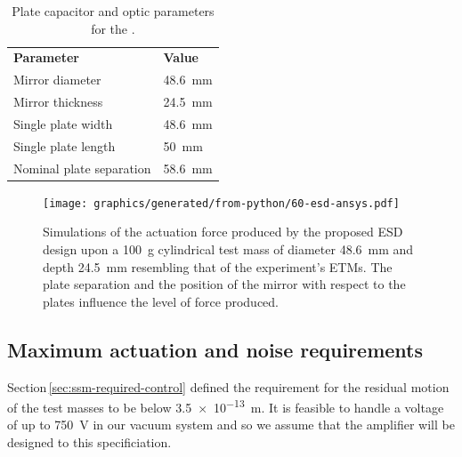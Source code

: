 \begin{table}
  \centering
  \begin{tabular}{ll}
    \textbf{Parameter}   & \textbf{Value} \\
    Mirror diameter      & \SI{48.6}{\milli\meter} \\
    Mirror thickness     & \SI{24.5}{\milli\meter} \\
    Single plate width   & \SI{48.6}{\milli\meter} \\
    Single plate length  & \SI{50}{\milli\meter} \\
    Nominal plate separation & \SI{58.6}{\milli\meter} \\
  \end{tabular}
  \caption[Plate capacitor and optic parameters for the \SSMEXPT{}]{\label{tab:ssm-esd-parameters}Plate capacitor and optic parameters for the \SSMEXPT{}.}
\end{table}

\begin{figure}
  \centering
  \texttt{[image: graphics/generated/from-python/60-esd-ansys.pdf]}
  \caption[Simulations of the actuation force produced by the proposed electrostatic drive design]{\label{fig:ssm-esd-ansys}Simulations of the actuation force produced by the proposed \gls{ESD} design upon a \SI{100}{\gram} cylindrical test mass of diameter \SI{48.6}{\milli\meter} and depth \SI{24.5}{\milli\meter} resembling that of the \SSM experiment's ETMs. The plate separation and the position of the mirror with respect to the plates influence the level of force produced. }
\end{figure}

\subsection{Maximum actuation and noise requirements}
Section\,\ref{sec:ssm-required-control} defined the requirement for the residual motion of the test masses to be below \SI{3.5e-13}{\meter}. It is feasible to handle a voltage of up to \SI{750}{\volt} in our vacuum system and so we assume that the amplifier will be designed to this specificiation.

